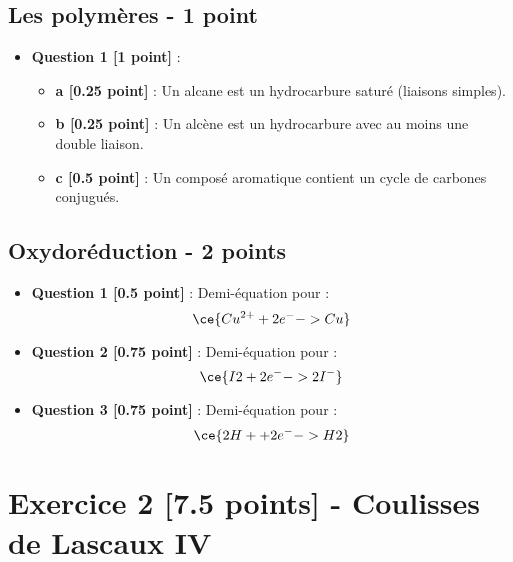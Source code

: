 \documentclass[a4paper,12pt]{article}
\begin{document}
\subsection*{Les polymères - 1 point}
\begin{itemize}
    \item \textbf{Question 1 [1 point]} :
    \begin{itemize}
        \item \textbf{a [0.25 point]} : Un alcane est un hydrocarbure saturé (liaisons simples).
        \item \textbf{b [0.25 point]} : Un alcène est un hydrocarbure avec au moins une double liaison.
        \item \textbf{c [0.5 point]} : Un composé aromatique contient un cycle de carbones conjugués.
    \end{itemize}
\end{itemize}

\subsection*{Oxydoréduction - 2 points}
\begin{itemize}
    \item \textbf{Question 1 [0.5 point]} : Demi-équation pour  : 
    \[
    \ce{Cu^{2+} + 2e^- -> Cu}
    \]
    \item \textbf{Question 2 [0.75 point]} : Demi-équation pour  :
    \[
    \ce{I2 + 2e^- -> 2I^-}
    \]
    \item \textbf{Question 3 [0.75 point]} : Demi-équation pour  :
    \[
    \ce{2H+ + 2e^- -> H2}
    \]
\end{itemize}

\section*{Exercice 2 [7.5 points] - Coulisses de Lascaux IV}
\end{document}

